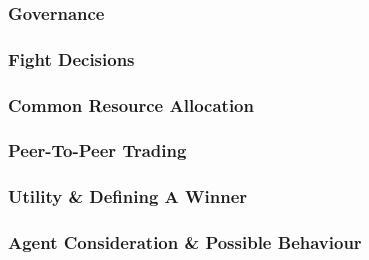 
\subsubsection{Governance}\label{sec: gov}


\subsubsection{Fight Decisions}\label{sec: fight decision}


\subsubsection{Common Resource Allocation}\label{sec: cmr}


\subsubsection{Peer-To-Peer Trading}\label{sec: trading}


\subsubsection{Utility \& Defining A Winner}\label{sec: winner}



\subsubsection{Agent Consideration \& Possible Behaviour}\label{sec: behaviour}


